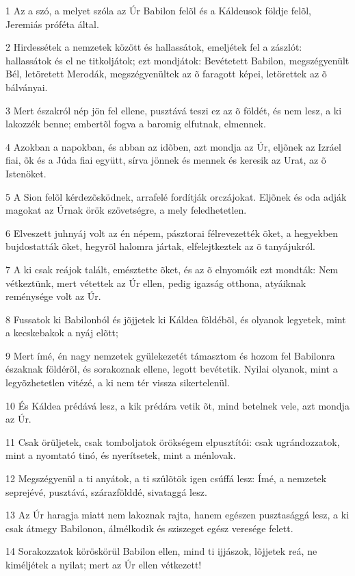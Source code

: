 \par 1 Az a szó, a melyet szóla az Úr Babilon felõl és a Káldeusok földje felõl, Jeremiás próféta által.
\par 2 Hirdessétek a nemzetek között és hallassátok, emeljétek fel a zászlót: hallassátok és el ne titkoljátok; ezt mondjátok: Bevétetett Babilon, megszégyenült Bél, letöretett Merodák, megszégyenültek az õ faragott képei, letörettek az õ bálványai.
\par 3 Mert északról nép jön fel ellene, pusztává teszi ez az õ földét, és nem lesz, a ki lakozzék benne; embertõl fogva a baromig elfutnak, elmennek.
\par 4 Azokban a napokban, és abban az idõben, azt mondja az Úr, eljõnek az Izráel fiai, õk és a Júda fiai együtt, sírva jönnek és mennek és keresik az Urat, az õ Istenöket.
\par 5 A Sion felõl kérdezõsködnek, arrafelé fordítják orczájokat. Eljõnek és oda adják magokat az Úrnak örök szövetségre, a mely feledhetetlen.
\par 6 Elveszett juhnyáj volt az én népem, pásztorai félrevezették õket, a hegyekben bujdostatták õket, hegyrõl halomra jártak, elfelejtkeztek az õ tanyájukról.
\par 7 A ki csak reájok talált, emésztette õket, és az õ elnyomóik ezt mondták: Nem vétkeztünk, mert vétettek az Úr ellen, pedig igazság otthona, atyáiknak reménysége volt az Úr.
\par 8 Fussatok ki Babilonból és jõjjetek ki Káldea földébõl, és olyanok legyetek, mint a kecskebakok a nyáj elõtt;
\par 9 Mert ímé, én nagy nemzetek gyülekezetét támasztom és hozom fel Babilonra északnak földérõl, és sorakoznak ellene, legott bevétetik. Nyilai olyanok, mint a legyõzhetetlen vitézé, a ki nem tér vissza sikertelenül.
\par 10 És Káldea prédává lesz, a kik prédára vetik õt, mind betelnek vele, azt mondja az Úr.
\par 11 Csak örüljetek, csak tomboljatok örökségem elpusztítói: csak ugrándozzatok, mint a nyomtató tinó, és nyerítsetek, mint a ménlovak.
\par 12 Megszégyenül a ti anyátok, a ti szûlõtök igen csúffá lesz: Ímé, a nemzetek seprejévé, pusztává, szárazfölddé, sivataggá lesz.
\par 13 Az Úr haragja miatt nem lakoznak rajta, hanem egészen pusztasággá lesz, a ki csak átmegy Babilonon, álmélkodik és sziszeget egész veresége felett.
\par 14 Sorakozzatok köröskörül Babilon ellen, mind ti ijjászok, lõjjetek reá, ne kiméljétek a nyilat; mert az Úr ellen vétkezett!

